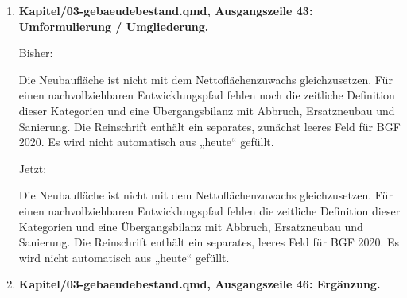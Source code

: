 \documentclass[
  ngerman,
  a4paper,
  DIV=11]{scrreprt}
\newenvironment{Shaded}{\begin{snugshade}}{\end{snugshade}}
\newcommand{\NormalTok}[1]{\textcolor[rgb]{0.00,0.23,0.31}{#1}}
\begin{document}
\begin{enumerate}
  Bisher:

\begin{Shaded}
\begin{Highlighting}[]
\NormalTok{![Flächenverteilung nach Geometrie. „Heute“ bezeichnet die gleichnamige Quellspalte mit noch offenem Bezugsjahr.](../Berechnungen/gebaeudesektormodell/outputs/flaechen.png)\{\#fig{-}gebaeude{-}flaechen width="100\%"\}}
\end{Highlighting}
\end{Shaded}

  Jetzt:

\begin{Shaded}
\begin{Highlighting}[]
\NormalTok{![Flächenverteilung nach Geometrie. „Heute“ bezeichnet die gleichnamige Quellspalte mit nicht festgelegtem Bezugsjahr.](../Berechnungen/gebaeudesektormodell/outputs/flaechen.png)\{\#fig{-}gebaeude{-}flaechen width="100\%"\}}
\end{Highlighting}
\end{Shaded}
\item
  \textbf{Kapitel/03-gebaeudebestand.qmd, Ausgangszeile 43:
  Umformulierung / Umgliederung.}

  Bisher:

\begin{Shaded}
\begin{Highlighting}[]
\NormalTok{Die Neubaufläche ist nicht mit dem Nettoflächenzuwachs gleichzusetzen. Für einen nachvollziehbaren Entwicklungspfad fehlen noch die zeitliche Definition dieser Kategorien und eine Übergangsbilanz mit Abbruch, Ersatzneubau und Sanierung. Die Reinschrift enthält ein separates, zunächst leeres Feld für BGF 2020. Es wird nicht automatisch aus „heute“ gefüllt.}
\end{Highlighting}
\end{Shaded}

  Jetzt:

\begin{Shaded}
\begin{Highlighting}[]
\NormalTok{Die Neubaufläche ist nicht mit dem Nettoflächenzuwachs gleichzusetzen. Für einen nachvollziehbaren Entwicklungspfad fehlen die zeitliche Definition dieser Kategorien und eine Übergangsbilanz mit Abbruch, Ersatzneubau und Sanierung. Die Reinschrift enthält ein separates, leeres Feld für BGF 2020. Es wird nicht automatisch aus „heute“ gefüllt.}
\end{Highlighting}
\end{Shaded}
\item
  \textbf{Kapitel/03-gebaeudebestand.qmd, Ausgangszeile 46: Ergänzung.}


\end{enumerate}
\end{document}
